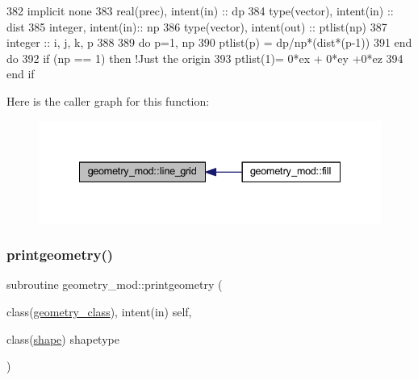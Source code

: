 \begin{DoxyCode}
382     \textcolor{keywordtype}{implicit none}
383     \textcolor{keywordtype}{real(prec)}, \textcolor{keywordtype}{intent(in)} :: dp
384     \textcolor{keywordtype}{type}(vector), \textcolor{keywordtype}{intent(in)} :: dist
385     \textcolor{keywordtype}{integer}, \textcolor{keywordtype}{intent(in)}::  np
386     \textcolor{keywordtype}{type}(vector), \textcolor{keywordtype}{intent(out)} :: ptlist(np)
387     \textcolor{keywordtype}{integer} :: i, j, k, p
388 
389     \textcolor{keywordflow}{do} p=1, np
390         ptlist(p) = dp/np*(dist*(p-1))
391 \textcolor{keywordflow}{    end do}
392     \textcolor{keywordflow}{if} (np == 1) \textcolor{keywordflow}{then} \textcolor{comment}{!Just the origin}
393         ptlist(1)= 0*ex + 0*ey +0*ez
394 \textcolor{keywordflow}{    end if}
\end{DoxyCode}
Here is the caller graph for this function\+:\nopagebreak
\begin{figure}[H]
\begin{center}
\leavevmode
\includegraphics[width=335pt]{namespacegeometry__mod_abcb09c0f5274c27cb79b0dd009ed94b3_icgraph}
\end{center}
\end{figure}
\mbox{\label{namespacegeometry__mod_aed4426181ca851b41717edd50268e5f3}} 
\subsubsection{\texorpdfstring{printgeometry()}{printgeometry()}}
{\footnotesize\ttfamily subroutine geometry\+\_\+mod\+::printgeometry (\begin{DoxyParamCaption}\item[{class(\mbox{\hyperlink{structgeometry__mod_1_1geometry__class}{geometry\+\_\+class}}), intent(in)}]{self,  }\item[{class(\mbox{\hyperlink{structgeometry__mod_1_1shape}{shape}})}]{shapetype }\end{DoxyParamCaption})\hspace{0.3cm}{\ttfamily [private]}}



